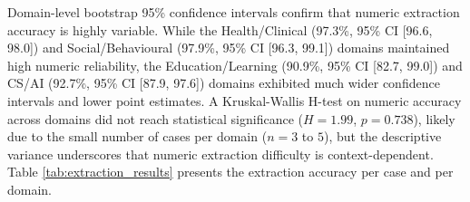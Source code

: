 \documentclass[12pt]{article}
\begin{document}
Domain-level bootstrap 95\% confidence intervals confirm that numeric extraction accuracy is highly variable. While the Health/Clinical (97.3\%, 95\% CI [96.6, 98.0]) and Social/Behavioural (97.9\%, 95\% CI [96.3, 99.1]) domains maintained high numeric reliability, the Education/Learning (90.9\%, 95\% CI [82.7, 99.0]) and CS/AI (92.7\%, 95\% CI [87.9, 97.6]) domains exhibited much wider confidence intervals and lower point estimates. A Kruskal-Wallis H-test on numeric accuracy across domains did not reach statistical significance ($H = 1.99$, $p = 0.738$), likely due to the small number of cases per domain ($n=3$ to $5$), but the descriptive variance underscores that numeric extraction difficulty is context-dependent. Table \ref{tab:extraction_results} presents the extraction accuracy per case and per domain.

\begin{table}[H]
\centering
\caption{LLM-as-Judge Extraction Accuracy across the 20 Case Studies}
\label{tab:extraction_results}
\end{table}
\end{document}
